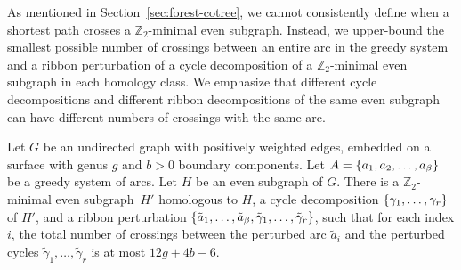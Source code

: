 \documentclass[letterpaper,review]{siamart190516}
\def\Z{\mathbb{Z}}
\begin{document}
As mentioned in Section~\ref{sec:forest-cotree}, we cannot consistently define when a shortest path crosses a $\Z_2$-minimal even subgraph.  Instead, we upper-bound the smallest possible number of crossings between an entire arc in the greedy system and a ribbon perturbation of a cycle decomposition of a $\Z_2$-minimal even subgraph in each homology class.  We emphasize that different cycle decompositions and different ribbon decompositions of the same even subgraph can have different numbers of crossings with the same arc.

\begin{lemma}
\label{lem:crossing}
Let $G$ be an undirected graph with positively weighted edges, embedded on a surface with genus $g$ and $b>0$ boundary components.
Let $A = \left\{ a_1, a_2, \dots, a_\beta \right\}$ be a greedy system of arcs.
Let $H$ be an even subgraph of $G$.
There is a $\Z_2$-minimal even subgraph~$H'$ homologous to $H$, a cycle decomposition $\{ \gamma_1, \dots, \gamma_r \}$ of $H'$, and a ribbon perturbation $\{ \tilde{a}_1,  \dots, \tilde{a}_\beta, \tilde\gamma_1, \dots, \tilde\gamma_r \}$, such that for each index $i$, the total number of crossings between the perturbed arc $\tilde{a}_i$ and the perturbed cycles $\tilde\gamma_1, \dots, \tilde\gamma_r$ is at most $12g+4b-6$.
\end{lemma}

\end{document}
